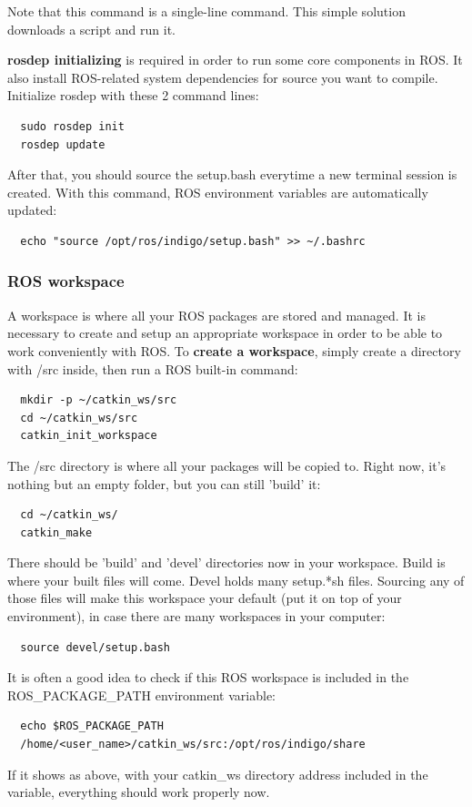 \documentclass[pdftex,12pt,a4paper]{article}
\begin{document}
  Note that this command is a single-line command. This simple solution downloads a script and run it.\par
  \textbf{rosdep initializing} is required in order to run some core components in ROS. It also install ROS-related system dependencies for source you want to compile. Initialize rosdep with these 2 command lines:
  \begin{lstlisting}
  sudo rosdep init
  rosdep update
  \end{lstlisting}
  After that, you should source the setup.bash everytime a new terminal session is created. With this command, ROS environment variables are automatically updated:
  \begin{lstlisting}
  echo "source /opt/ros/indigo/setup.bash" >> ~/.bashrc
  \end{lstlisting}
  
  \newpage
  \subsubsection{ROS workspace}
  A workspace is where all your ROS packages are stored and managed. It is necessary to create and setup an appropriate workspace in order to be able to work conveniently with ROS.
  To \textbf{create a workspace}, simply create a directory with /src inside, then run a ROS built-in command:
  \begin{lstlisting}
  mkdir -p ~/catkin_ws/src
  cd ~/catkin_ws/src
  catkin_init_workspace
  \end{lstlisting}
  The /src directory is where all your packages will be copied to. Right now, it's nothing but an empty folder, but you can still 'build' it:
  \begin{lstlisting}
  cd ~/catkin_ws/
  catkin_make
  \end{lstlisting}
  There should be 'build' and 'devel' directories now in your workspace. Build is where your built files will come. Devel holds many setup.*sh files. Sourcing any of those files will make this workspace your default (put it on top of your environment), in case there are many workspaces in your computer:
  \begin{lstlisting}
  source devel/setup.bash
  \end{lstlisting}
  It is often a good idea to check if this ROS workspace is included in the ROS\_PACKAGE\_PATH environment variable:
  \begin{lstlisting}
  echo $ROS_PACKAGE_PATH
  /home/<user_name>/catkin_ws/src:/opt/ros/indigo/share
  \end{lstlisting}
  If it shows as above, with your catkin\_ws directory address included in the variable, everything should work properly now.
  
\end{document}

